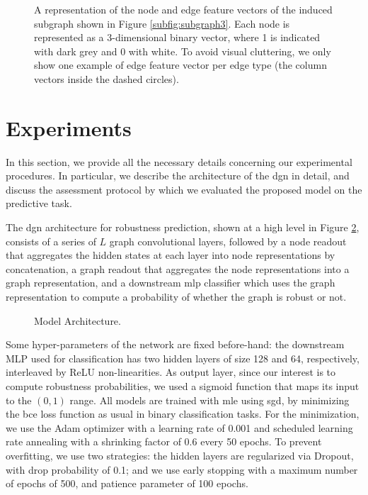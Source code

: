 \begin{figure}[h!]
    \centering
    \resizebox{.8\textwidth}{!}{}
    \caption{A representation of the node and edge feature vectors of the induced subgraph shown in Figure \ref{subfig:subgraph3}. Each node is represented as a 3-dimensional binary vector, where 1 is indicated with dark grey and 0 with white. To avoid visual cluttering, we only show one example of edge feature vector per edge type (the column vectors inside the dashed circles).}
    \label{fig:pathway-graph-features}
\end{figure}

\section{Experiments}\label{sec:pathway-experiments}
In this section, we provide all the necessary details concerning our experimental procedures. In particular, we describe the architecture of the \gls{dgn} in detail, and discuss the assessment protocol by which we evaluated the proposed model on the predictive task.

The \gls{dgn} architecture for robustness prediction, shown at a high level in Figure \ref{fig:architecture}, consists of a series of $L$ graph convolutional layers, followed by a node readout that aggregates the hidden states at each layer into node representations by concatenation, a graph readout that aggregates the node representations into a graph representation, and a downstream \gls{mlp} classifier which uses the graph representation to compute a probability of whether the graph is robust or not.
\begin{figure}[h!]
    \centering
    \resizebox{.95\textwidth}{!}{}
    \caption{Model Architecture.}
    \label{fig:architecture}
\end{figure}
Some hyper-parameters of the network are fixed before-hand: the downstream MLP used for classification has two hidden layers of size 128 and 64, respectively, interleaved by ReLU non-linearities. As output layer, since our interest is to compute robustness probabilities, we used a sigmoid function that maps its input to the $(0, 1)$ range. All models are trained with \gls{mle} using \gls{sgd}, by minimizing the \gls{bce} loss function as usual in binary classification tasks. For the minimization, we use the Adam optimizer with a learning rate of 0.001 and scheduled learning rate annealing with a shrinking factor of 0.6 every 50 epochs. To prevent overfitting, we use two strategies: the hidden layers are regularized via Dropout, with drop probability of 0.1; and we use early stopping with a maximum number of epochs of 500, and patience parameter of 100 epochs.

